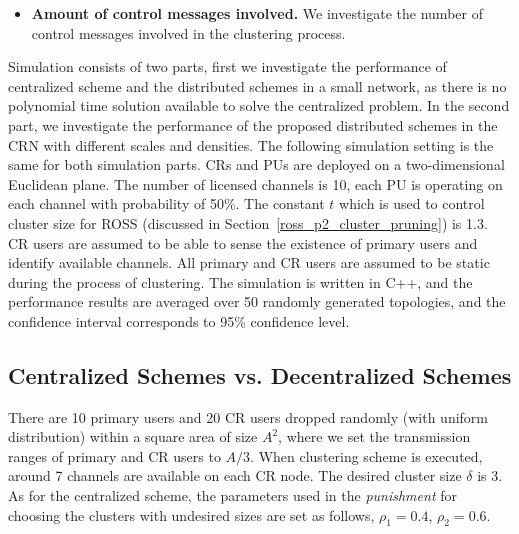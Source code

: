 \documentclass[10pt,journal,compsoc]{IEEEtran}
\theoremstyle{mytheoremstyle}
\theoremstyle{mytheoremstyle}
\theoremstyle{mytheoremstyle}
\begin{document}
\begin{itemize}
\item \textbf{Amount of control messages involved.}
We investigate the number of control messages involved in the clustering process.

\end{itemize}

Simulation consists of two parts, first we investigate the performance of centralized scheme and the distributed schemes in a small network, as there is no polynomial time solution available to solve the centralized problem.
In the second part, we investigate the performance of the proposed distributed schemes in the CRN with different scales and densities.
The following simulation setting is the same for both simulation parts.
CRs and PUs are deployed on a two-dimensional Euclidean plane.
The number of licensed channels is 10, each PU is operating on each channel with probability of 50\%.
The constant $t$ which is used to control cluster size for ROSS (discussed in Section~\ref{ross_p2_cluster_pruning}) is 1.3.
CR users are assumed to be able to sense the existence of primary users and identify available channels.
All primary and CR users are assumed to be static during the process of clustering.
The simulation is written in C++, and the performance results are averaged over 50 randomly generated topologies, and the confidence interval corresponds to 95\% confidence level.


\subsection{Centralized Schemes vs. Decentralized Schemes}
There are 10 primary users and 20 CR users dropped randomly (with uniform distribution) within a square area of size $A^{2}$, where we set the transmission ranges of primary and CR users to $A/3$.
When clustering scheme is executed, around 7 channels are available on each CR node.
The desired cluster size $\delta$ is 3.
As for the centralized scheme, the parameters used in the \textit{punishment} for choosing the clusters with undesired sizes are set as follows, $\rho_1 =  0.4$, $\rho_2 =  0.6$.
\end{document}
